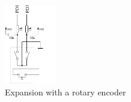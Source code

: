 \begin{figure}
\vspace{-4\baselineskip}
\begin{center}
\includegraphics[width=0.2\textwidth]{../FIG/rotary_extension.pdf}
\end{center}
\vspace{-0.7\baselineskip}
 \caption{Expansion with a rotary encoder}
\label{fig:RotExt}
\end{figure}


